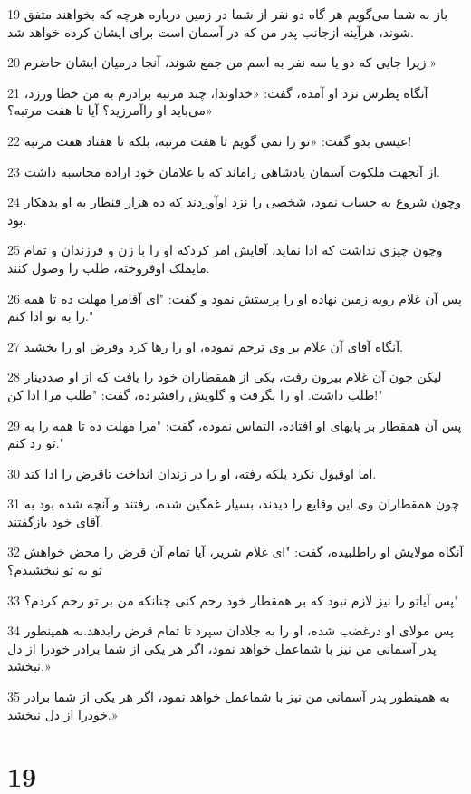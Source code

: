 \par 19 باز به شما می‌گویم هر گاه دو نفر از شما در زمین درباره هر‌چه که بخواهند متفق شوند، هرآینه ازجانب پدر من که در آسمان است برای ایشان کرده خواهد شد.
\par 20 زیرا جایی که دو یا سه نفر به اسم من جمع شوند، آنجا درمیان ایشان حاضرم.»
\par 21 آنگاه پطرس نزد او آمده، گفت: «خداوندا، چند مرتبه برادرم به من خطا ورزد، می‌باید او راآمرزید؟ آیا تا هفت مرتبه؟»
\par 22 عیسی بدو گفت: «تو را نمی گویم تا هفت مرتبه، بلکه تا هفتاد هفت مرتبه!
\par 23 از آنجهت ملکوت آسمان پادشاهی راماند که با غلامان خود اراده محاسبه داشت.
\par 24 وچون شروع به حساب نمود، شخصی را نزد اوآوردند که ده هزار قنطار به او بدهکار بود.
\par 25 وچون چیزی نداشت که ادا نماید، آقایش امر کردکه او را با زن و فرزندان و تمام مایملک اوفروخته، طلب را وصول کنند.
\par 26 پس آن غلام روبه زمین نهاده او را پرستش نمود و گفت: "ای آقامرا مهلت ده تا همه را به تو ادا کنم."
\par 27 آنگاه آقای آن غلام بر وی ترحم نموده، او را رها کرد وقرض او را بخشید.
\par 28 لیکن چون آن غلام بیرون رفت، یکی از همقطاران خود را یافت که از او صددینار طلب داشت. او را بگرفت و گلویش رافشرده، گفت: "طلب مرا ادا کن!"
\par 29 پس آن همقطار بر پایهای او افتاده، التماس نموده، گفت: "مرا مهلت ده تا همه را به تو رد کنم."
\par 30 اما اوقبول نکرد بلکه رفته، او را در زندان انداخت تاقرض را ادا کند.
\par 31 چون همقطاران وی این وقایع را دیدند، بسیار غمگین شده، رفتند و آنچه شده بود به آقای خود باز‌گفتند.
\par 32 آنگاه مولایش او راطلبیده، گفت: "ای غلام شریر، آیا تمام آن قرض را محض خواهش تو به تو نبخشیدم؟
\par 33 پس آیاتو را نیز لازم نبود که بر همقطار خود رحم کنی چنانکه من بر تو رحم کردم؟"
\par 34 پس مولای او درغضب شده، او را به جلادان سپرد تا تمام قرض رابدهد.به همینطور پدر آسمانی من نیز با شماعمل خواهد نمود، اگر هر یکی از شما برادر خودرا از دل نبخشد.»
\par 35 به همینطور پدر آسمانی من نیز با شماعمل خواهد نمود، اگر هر یکی از شما برادر خودرا از دل نبخشد.»

\chapter{19}

